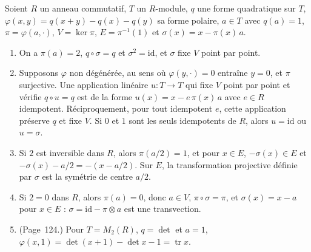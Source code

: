 \begin{enonce}
Soient $R$ un anneau commutatif, $T$ un $R$-module, $q$ une forme quadratique sur $T$, $\varphi(x, y) = q(x + y) - q(x) - q(y)$ sa forme polaire, $a \in T$ avec $q(a) = 1$, $\pi = \varphi(a, \cdot)$, $V = \ker \pi$, $E = \pi^{-1}(1)$ et $\sigma(x) = x - \pi(x)\,a$.
\begin{enumerate}
\item On a $\pi(a) = 2$, $q \circ \sigma = q$ et $\sigma^2 = \mathrm{id}$, et $\sigma$ fixe $V$ point par point.
\item Supposons $\varphi$ non dégénérée, au sens où $\varphi(y, \cdot) = 0$ entraîne $y = 0$, et $\pi$ surjective. Une application linéaire $u : T \to T$ qui fixe $V$ point par point et vérifie $q \circ u = q$ est de la forme $u(x) = x - e\,\pi(x)\,a$ avec $e \in R$ idempotent. Réciproquement, pour tout idempotent $e$, cette application préserve $q$ et fixe $V$. Si $0$ et $1$ sont les seuls idempotents de $R$, alors $u = \mathrm{id}$ ou $u = \sigma$.
\item Si $2$ est inversible dans $R$, alors $\pi(a/2) = 1$, et pour $x \in E$, $-\sigma(x) \in E$ et $-\sigma(x) - a/2 = -(x - a/2)$. Sur $E$, la transformation projective définie par $\sigma$ est la symétrie de centre $a/2$.
\item Si $2 = 0$ dans $R$, alors $\pi(a) = 0$, donc $a \in V$, $\pi \circ \sigma = \pi$, et $\sigma(x) = x - a$ pour $x \in E$ : $\sigma = \mathrm{id} - \pi \otimes a$ est une transvection.
\item (Page~124.) Pour $T = M_2(R)$, $q = \det$ et $a = 1$, $\varphi(x, 1) = \det(x + 1) - \det x - 1 = \operatorname{tr} x$.
\end{enumerate}
\end{enonce}

